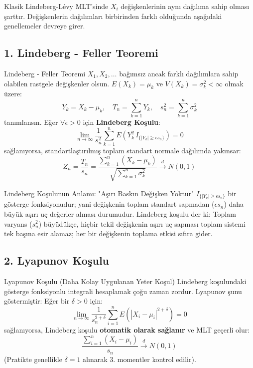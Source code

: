 \documentclass[12pt,a4paper]{article}
\begin{document}
Klasik Lindeberg-Lévy MLT'sinde $X_i$ değişkenlerinin aynı dağılıma sahip olması şarttır. Değişkenlerin dağılımları birbirinden farklı olduğunda aşağıdaki genellemeler devreye girer.

\subsection{1. Lindeberg - Feller Teoremi}

\begin{tanim}{Lindeberg - Feller Teoremi}
$X_1, X_2, \dots$ bağımsız ancak farklı dağılımlara sahip olabilen rastgele değişkenler olsun. $E(X_k) = \mu_k$ ve $V(X_k) = \sigma_k^2 < \infty$ olmak üzere:
\begin{equation}
    Y_k = X_k - \mu_k, \quad T_n = \sum_{k=1}^n Y_k, \quad s_n^2 = \sum_{k=1}^n \sigma_k^2
\end{equation}
tanımlansın. Eğer $\forall \epsilon > 0$ için \textbf{Lindeberg Koşulu}:
\begin{equation}
    \lim_{n \to \infty} \frac{1}{s_n^2} \sum_{k=1}^n E\left( Y_k^2 \, I_{\{|Y_k| \ge \epsilon s_n\}} \right) = 0
\end{equation}
sağlanıyorsa, standartlaştırılmış toplam standart normale dağılımda yakınsar:
\begin{equation}
    Z_n = \frac{T_n}{s_n} = \frac{\sum_{k=1}^n (X_k - \mu_k)}{\sqrt{\sum_{k=1}^n \sigma_k^2}} \xrightarrow{d} N(0, 1)
\end{equation}
\end{tanim}

\begin{sezgi}{Lindeberg Koşulunun Anlamı: "Aşırı Baskın Değişken Yoktur"}
$I_{\{|Y_k| \ge \epsilon s_n\}}$ bir gösterge fonksiyonudur; yani değişkenin toplam standart sapmadan ($\epsilon s_n$) daha büyük aşırı uç değerler alması durumudur.  
Lindeberg koşulu der ki: Toplam varyans ($s_n^2$) büyüdükçe, hiçbir tekil değişkenin aşırı uç sapması toplam sistemi tek başına esir alamaz; her bir değişkenin toplama etkisi sıfıra gider.
\end{sezgi}

\subsection{2. Lyapunov Koşulu}

\begin{tanim}{Lyapunov Koşulu (Daha Kolay Uygulanan Yeter Koşul)}
Lindeberg koşulundaki gösterge fonksiyonlu integrali hesaplamak çoğu zaman zordur. Lyapunov şunu göstermiştir: Eğer bir $\delta > 0$ için:
\begin{equation}
    \lim_{n \to \infty} \frac{1}{s_n^{2+\delta}} \sum_{i=1}^n E\left( |X_i - \mu_i|^{2+\delta} \right) = 0
\end{equation}
sağlanıyorsa, Lindeberg koşulu \textbf{otomatik olarak sağlanır} ve MLT geçerli olur:
\begin{equation}
    \frac{\sum_{i=1}^n (X_i - \mu_i)}{s_n} \xrightarrow{d} N(0, 1)
\end{equation}
(Pratikte genellikle $\delta = 1$ alınarak 3. momentler kontrol edilir).
\end{tanim}
\end{document}
